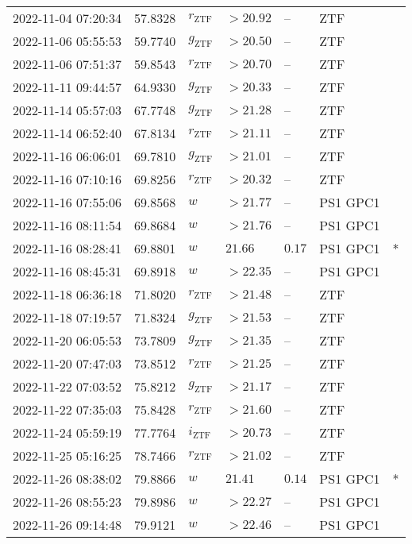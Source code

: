 \documentclass{nature_plusfigure}
\begin{document}
\begin{supplement}
\begin{center}
\begin{longtable}{lllllll}
2022-11-04 07:20:34 & 57.8328 & ${r}_\mathrm{ZTF}$ & $>20.92$ & -- & ZTF &  \\ 
2022-11-06 05:55:53 & 59.7740 & ${g}_\mathrm{ZTF}$ & $>20.50$ & -- & ZTF &  \\ 
2022-11-06 07:51:37 & 59.8543 & ${r}_\mathrm{ZTF}$ & $>20.70$ & -- & ZTF &  \\ 
2022-11-11 09:44:57 & 64.9330 & ${g}_\mathrm{ZTF}$ & $>20.33$ & -- & ZTF &  \\ 
2022-11-14 05:57:03 & 67.7748 & ${g}_\mathrm{ZTF}$ & $>21.28$ & -- & ZTF &  \\ 
2022-11-14 06:52:40 & 67.8134 & ${r}_\mathrm{ZTF}$ & $>21.11$ & -- & ZTF &  \\ 
2022-11-16 06:06:01 & 69.7810 & ${g}_\mathrm{ZTF}$ & $>21.01$ & -- & ZTF &  \\ 
2022-11-16 07:10:16 & 69.8256 & ${r}_\mathrm{ZTF}$ & $>20.32$ & -- & ZTF &  \\ 
2022-11-16 07:55:06 & 69.8568 & $w$ & $>21.77$ & -- & PS1 GPC1 &  \\ 
2022-11-16 08:11:54 & 69.8684 & $w$ & $>21.76$ & -- & PS1 GPC1 &  \\ 
2022-11-16 08:28:41 & 69.8801 & $w$ & $21.66$ & $0.17$ & PS1 GPC1 & * \\ 
2022-11-16 08:45:31 & 69.8918 & $w$ & $>22.35$ & -- & PS1 GPC1 &  \\ 
2022-11-18 06:36:18 & 71.8020 & ${r}_\mathrm{ZTF}$ & $>21.48$ & -- & ZTF &  \\ 
2022-11-18 07:19:57 & 71.8324 & ${g}_\mathrm{ZTF}$ & $>21.53$ & -- & ZTF &  \\ 
2022-11-20 06:05:53 & 73.7809 & ${g}_\mathrm{ZTF}$ & $>21.35$ & -- & ZTF &  \\ 
2022-11-20 07:47:03 & 73.8512 & ${r}_\mathrm{ZTF}$ & $>21.25$ & -- & ZTF &  \\ 
2022-11-22 07:03:52 & 75.8212 & ${g}_\mathrm{ZTF}$ & $>21.17$ & -- & ZTF &  \\ 
2022-11-22 07:35:03 & 75.8428 & ${r}_\mathrm{ZTF}$ & $>21.60$ & -- & ZTF &  \\ 
2022-11-24 05:59:19 & 77.7764 & ${i}_\mathrm{ZTF}$ & $>20.73$ & -- & ZTF &  \\ 
2022-11-25 05:16:25 & 78.7466 & ${r}_\mathrm{ZTF}$ & $>21.02$ & -- & ZTF &  \\ 
2022-11-26 08:38:02 & 79.8866 & $w$ & $21.41$ & $0.14$ & PS1 GPC1 & * \\ 
2022-11-26 08:55:23 & 79.8986 & $w$ & $>22.27$ & -- & PS1 GPC1 &  \\ 
2022-11-26 09:14:48 & 79.9121 & $w$ & $>22.46$ & -- & PS1 GPC1 &  \\ 

\end{longtable}
\end{center}
\end{supplement}
\end{document}
